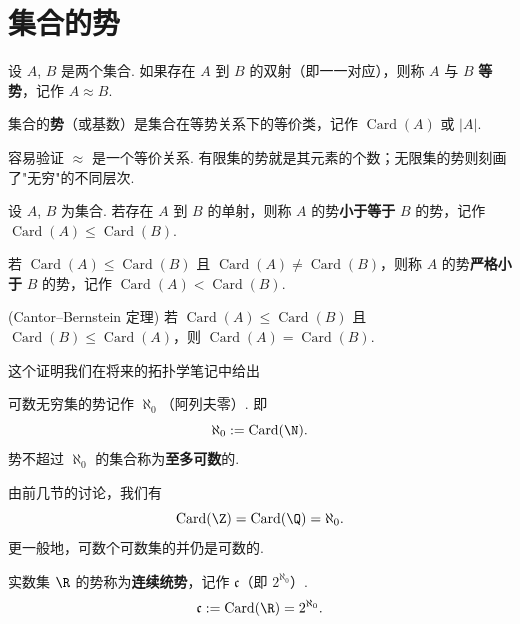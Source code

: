 \section{集合的势}
\begin{definition}
	设 $A$, $B$ 是两个集合. 如果存在 $A$ 到 $B$ 的双射（即一一对应），则称 $A$ 与 $B$ \textbf{等势}，记作 $A \approx B$.
	
	集合的\textbf{势}（或基数）是集合在等势关系下的等价类，记作 $\operatorname{Card}(A)$ 或 $|A|$.
\end{definition}

容易验证 $\approx$ 是一个等价关系. 有限集的势就是其元素的个数；无限集的势则刻画了"无穷"的不同层次.

\begin{definition}
	设 $A$, $B$ 为集合. 若存在 $A$ 到 $B$ 的单射，则称 $A$ 的势\textbf{小于等于} $B$ 的势，记作 $\operatorname{Card}(A) \leqslant \operatorname{Card}(B)$.
	
	若 $\operatorname{Card}(A) \leqslant \operatorname{Card}(B)$ 且 $\operatorname{Card}(A) \neq \operatorname{Card}(B)$，则称 $A$ 的势\textbf{严格小于} $B$ 的势，记作 $\operatorname{Card}(A) < \operatorname{Card}(B)$.
\end{definition}

\begin{theorem}(Cantor--Bernstein 定理)
	若 $\operatorname{Card}(A) \leqslant \operatorname{Card}(B)$ 且 $\operatorname{Card}(B) \leqslant \operatorname{Card}(A)$，则 $\operatorname{Card}(A) = \operatorname{Card}(B)$.
\end{theorem}
这个证明我们在将来的拓扑学笔记中给出
\begin{definition}
	可数无穷集的势记作 $\aleph_0$（阿列夫零）. 即
	\[
	\aleph_0 := \operatorname{Card}(\N).
	\]
	势不超过 $\aleph_0$ 的集合称为\textbf{至多可数}的.
\end{definition}

由前几节的讨论，我们有
\[
\operatorname{Card}(\Z) = \operatorname{Card}(\Q) = \aleph_0.
\]
更一般地，可数个可数集的并仍是可数的.

\begin{definition}
	实数集 $\R$ 的势称为\textbf{连续统势}，记作 $\mathfrak{c}$（即 $2^{\aleph_0}$）.
	\[
	\mathfrak{c} := \operatorname{Card}(\R) = 2^{\aleph_0}.
	\]
\end{definition}

